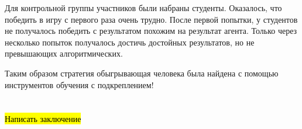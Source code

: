 \documentclass{article}
\begin{document}
Для контрольной группы участников были набраны студенты.
Оказалось, что победить в игру с первого раза очень трудно.
После первой попытки, у студентов не получалось победить с результатом похожим на результат агента.
Только через несколько попыток получалось достичь достойных результатов, но не превышающих алгоритмических.

Таким образом стратегия обыгрывающая человека была найдена с помощью инструментов обучения с подкреплением!


\newpage
\section*{}

\hl{Написать заключение}

\newpage

\renewcommand\refname{\centering{СПИСОК ИСПОЛЬЗОВАННЫХ ИСТОЧНИКОВ И ЛИТЕРАТУРЫ}}


 

\newpage
\end{document}
